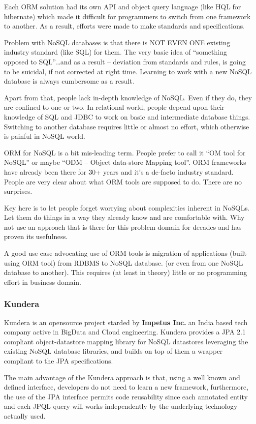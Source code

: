 Each ORM solution had its own API and object query language (like HQL for hibernate) which made it difficult for programmers to switch from one framework to another. As a result, efforts were made to make standards and specifications. 

Problem with NoSQL databases is that there is NOT EVEN ONE existing industry standard (like SQL) for them. The very basic idea of “something opposed to SQL”…and as a result – deviation from standards and rules, is going to be suicidal, if not corrected at right time. Learning to work with a new NoSQL database is always cumbersome as a result.

Apart from that, people lack in-depth knowledge of NoSQL. Even if they do, they are confined to one or two. In relational world, people depend upon their knowledge of SQL and JDBC to work on basic and intermediate database things. Switching to another database requires little or almost no effort, which otherwise is painful in NoSQL  world.

ORM for NoSQL is a bit mis-leading term. People prefer to call it “OM tool for NoSQL” or maybe “ODM – Object data-store Mapping tool”. ORM frameworks have already been there for 30+ years and it’s a de-facto industry standard. People are very clear about what ORM tools are supposed to do. There are no surprises.

Key here is to let people forget worrying about complexities inherent in NoSQLs. Let them do things in a way they already know and are comfortable with. Why not use an approach that is there for this problem domain for decades and has proven its usefulness.

A good use case advocating use of ORM tools is migration of applications (built using ORM tool) from RDBMS to NoSQL database. (or even from one NoSQL database to another). This requires (at least in theory) little or no programming effort in business domain.

\subsubsection{Kundera}
Kundera is an opensource project starded by \textbf{Impetus Inc.} an India based tech company active in BigData and Cloud engineering.
Kundera provides a JPA 2.1 compliant object-datastore mapping library for NoSQL datastores leveraging the existing NoSQL database libraries, and builds on top of them a wrapper compliant to the JPA specifications.

\newparagraph The main advantage of the Kundera approach is that, using a well known and defined interface, developers do not need to learn a new framework, furthermore, the use of the JPA interface permits code reusability since each annotated entity and each JPQL query will works independently by the underlying technology actually used.

